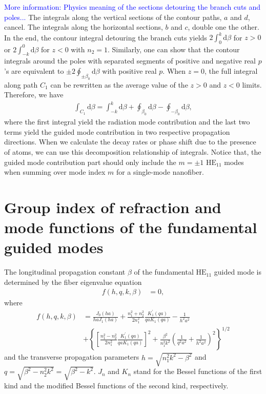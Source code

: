 \documentclass[preprint,aps,pra,onecolumn]{revtex4-1} %
\begin{document}
\textcolor{blue}{More information: Physics meaning of the sections detouring the branch cuts and poles...} The integrals along the vertical sections of the contour paths, $ a $ and $ d $, cancel. The integrals along the horizontal sections, $ b $ and $ c $, double one the other. In the end, the contour integral detouring the branch cuts yields $ 2\int_0^k\mathrm{d}\beta $ for $ z>0 $ or $ 2\int_{-k}^0\mathrm{d}\beta $ for $ z<0 $ with $ n_2=1 $. Similarly, one can show that the contour integrals around the poles with separated segments of positive and negative real $ p $'s are equivalent to $ \pm 2\oint_{\pm \beta_0}\!\!\mathrm{d}\beta $ with positive real $ p $. When $ z=0 $, the full integral along path $ C_1 $ can be rewritten as the average value of the $ z>0 $ and $ z<0 $ limits. Therefore, we have 
\begin{align}
\int_{C_1}\mathrm{d}\beta =\int_{-k}^k\mathrm{d}\beta +\oint_{\beta_0}\mathrm{d}\beta -\oint_{-\beta_0}\!\!\mathrm{d}\beta,
\end{align}
where the first integral yield the radiation mode contribution and the last two terms yield the guided mode contribution in two respective propagation directions. When we calculate the decay rates or phase shift due to the presence of atoms, we can use this decomposition relationship of integrals. Notice that, the guided mode contribution part should only include the $ m=\pm 1 $ $\mathrm{HE}_{11}$ modes when summing over mode index $ m $ for a single-mode nanofiber. 



\section{Group index of refraction and mode functions of the fundamental guided modes}\label{ch:guidedmodes}
The longitudinal propagation constant $\beta$ of the fundamental $\mathrm{HE}_{11}$ guided mode is determined by the fiber eigenvalue equation~\cite{LeKien2005}
\begin{align}
f(h,q,k,\beta) &=0,
\end{align}
where
\begin{align}
f(h,q,k,\beta) &=\frac{J_0(ha)}{haJ_1(ha)}+\frac{n_1^2+n_2^2}{2n_1^2}\frac{K_1^\prime(qa)}{qaK_1(qa)}-\frac{1}{h^2a^2} \\
&+\left\{\left[\frac{n_1^2-n_2^2}{2n_1^2}\frac{K_1^\prime(qa)}{qaK_1(qa)} \right]^2 +\frac{\beta^2}{n_1^2k^2}\left(\frac{1}{q^2a^2}+\frac{1}{h^2a^2} \right)^2 \right\}^{1/2}
\end{align}
and the transverse propagation parameters $h=\sqrt{n_1^2k^2-\beta^2}$ and $q=\sqrt{\beta^2-n_2^2k^2}=\sqrt{\beta^2-k^2}$. $J_n$ and $K_n$ stand for the Bessel functions of the first kind and the modified Bessel functions of the second kind, respectively. 
\end{document}
